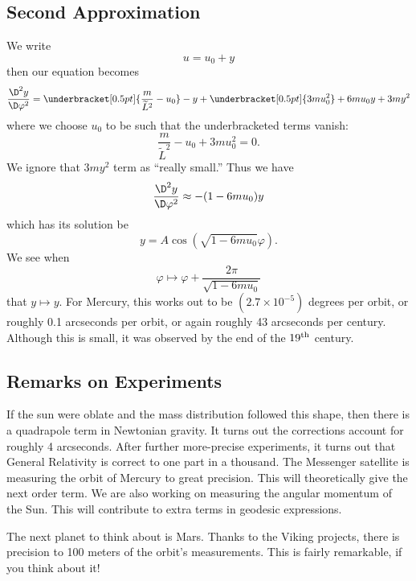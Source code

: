 \subsection{Second Approximation}
We write
\begin{equation}
u=u_{0}+y
\end{equation}
then our equation becomes
\begin{equation}
\frac{\D^{2}y}{\D\varphi^{2}}=\underbracket[0.5pt]{\frac{m}{\widetilde{L}^{2}}-u_{0}}-y+\underbracket[0.5pt]{3mu_{0}^{2}}+6mu_{0}y+3my^{2}
\end{equation}
where we choose $u_{0}$ to be such that the underbracketed terms
vanish:
\begin{equation}
\frac{m}{\widetilde{L}^{2}}-u_{0}+3mu_{0}^{2}=0.
\end{equation}
We ignore that $3my^{2}$ term as ``really small.'' Thus we have
\begin{equation}
\frac{\D^{2}y}{\D\varphi^{2}}\approx-(1-6mu_{0})y
\end{equation}
which has its solution be
\begin{equation}
y=A\cos(\sqrt{1-6mu_{0}}\varphi).
\end{equation}
We see when
\begin{equation}
\varphi\mapsto\varphi+\frac{2\pi}{\sqrt{1-6mu_{0}}}
\end{equation}
that $y\mapsto y$. For Mercury, this works out to be $(2.7\times
10^{-5})$ degrees per orbit, or roughly 0.1 arcseconds per orbit,
or again roughly 43 arcseconds per century. Although this is
small, it was observed by the end of the $19^{{\rm th}}$ century.

\subsection{Remarks on Experiments}
If the sun were oblate and the mass distribution followed this
shape, then there is a quadrapole term in Newtonian gravity.
It turns out the corrections account for roughly 4
arcseconds. After further more-precise experiments, it turns out
that General Relativity is correct to one part in a thousand. The
Messenger satellite is measuring the orbit of Mercury to great
precision. This will theoretically give the next order term.
We are also working on measuring the angular momentum of the
Sun. This will contribute to extra terms in geodesic expressions.

The next planet to think about is Mars. Thanks to the Viking
projects, there is precision to 100 meters of the orbit's
measurements. This is fairly remarkable, if you think about it!

